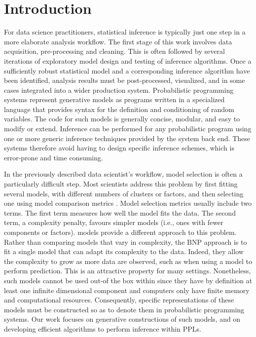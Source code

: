 \documentclass[twoside,10pt,openany,a4paper]{rapport}
\begin{document}

\mainmatter


\chapter{Introduction}

For data science practitioners, statistical inference is typically just one step in a more elaborate analysis workflow. The first stage of this work involves data acquisition, pre-processing and cleaning. This is often followed by several iterations of exploratory model design and testing of inference algorithms. Once a sufficiently robust statistical model and a corresponding inference algorithm have been identified, analysis results must be post-processed, visualized, and in some cases integrated into a wider production system.
Probabilistic programming systems \cite{Gordon:2014:PP:2593882.2593900,Goodman:2012uq,Mansinghka:2014ty,wood-aistats-2014,Turing} represent generative models as programs written in a specialized language that provides syntax for the definition and conditioning of random variables. The code for such models is generally concise, modular, and easy to modify or extend. Inference can be performed for any probabilistic program using one or more generic inference techniques provided by the system back end. These systems therefore avoid having to design specific inference schemes, which is error-prone and time consuming.

In the previously described data scientist's workflow, model selection is often a particularly difficult step.
Most scientists address this problem by first fitting several models, with different numbers of clusters or factors, and then selecting one using model comparison metrics \cite{Claeskens:1251912}. Model selection metrics usually include two terms. The first term measures how well the model fits the data. The second term, a complexity penalty, favours simpler models (i.e., ones with fewer components or factors).
 models provide a different approach to this problem. Rather than comparing models that vary in complexity, the \gls{BNP} approach is to fit a single model that can adapt its complexity to the data. Indeed, they allow the complexity to grow as more data are observed, such as when using a model to perform prediction. This is an attractive property for many settings.
Nonetheless, such models cannot be used out-of the box within  since they have by definition at least one infinite dimensional component and computers only have finite memory and computational resources. Consequently, specific representations of these models must be constructed so as to denote them in probabilistic programming systems. Our work focuses on generative constructions of such models, and on developing efficient algorithms to perform inference within \glspl{PPL}.
\end{document}
